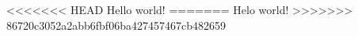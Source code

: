 \documentclass{article}
\begin{document}
<<<<<<< HEAD
  Hello world!
=======
  Helo world!
>>>>>>> 86720c3052a2abb6fbf06ba427457467cb482659
\end{document}
